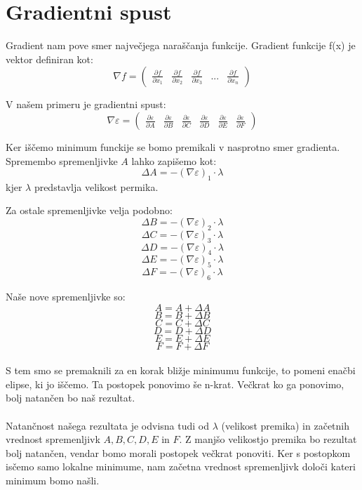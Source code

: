 \documentclass[a4paper, 12pt]{article}
\begin{document}
	\section*{Gradientni spust}
	Gradient nam pove smer največjega naraščanja funkcije. Gradient funkcije f(x) je vektor definiran kot:
	$$\nabla f = \begin{pmatrix}\frac{\partial f}{\partial x_{1}} & \frac{\partial f}{\partial x_{2}} & \frac{\partial f}{\partial x_{3}} & ... & \frac{\partial f}{\partial x_{n}}\end{pmatrix}$$
	
	V našem primeru je gradientni spust:
	$$\nabla \varepsilon = 
	\begin{pmatrix}
	\frac{\partial \varepsilon}{\partial A} &
	\frac{\partial \varepsilon}{\partial B} &
	\frac{\partial \varepsilon}{\partial C} &
	\frac{\partial \varepsilon}{\partial D} &
	\frac{\partial \varepsilon}{\partial E} &
	\frac{\partial \varepsilon}{\partial F}
	\end{pmatrix}$$
	
	Ker iščemo minimum funckije se bomo premikali v nasprotno smer gradienta. Spremembo spremenljivke $A$ lahko zapišemo kot:
	$$\Delta A = -(\nabla \varepsilon)_1 \cdot \lambda$$
	kjer $\lambda$ predstavlja velikost permika. 
	
	Za ostale spremenljivke velja podobno:
	$$\Delta B = -(\nabla \varepsilon)_2 \cdot \lambda$$
	$$\Delta C = -(\nabla \varepsilon)_3 \cdot \lambda$$
	$$\Delta D = -(\nabla \varepsilon)_4 \cdot \lambda$$
	$$\Delta E = -(\nabla \varepsilon)_5 \cdot \lambda$$
	$$\Delta F = -(\nabla \varepsilon)_6 \cdot \lambda$$
	
	Naše nove spremenljivke so:
	$$ A = A + \Delta A$$
	$$ B = B + \Delta B$$
	$$ C = C + \Delta C$$
	$$ D = D + \Delta D$$
	$$ E = E + \Delta E$$
	$$ F = F + \Delta F$$
	
	\paragraph{}
	S tem smo se premaknili za en korak bližje minimumu funkcije, to pomeni enačbi elipse, ki jo iščemo. Ta postopek ponovimo še n-krat. Večkrat ko ga ponovimo, bolj natančen bo naš rezultat. 
	\paragraph{}
	Natančnost našega rezultata je odvisna tudi od $\lambda$ (velikost premika) in začetnih vrednost spremenljivk $A, B, C, D, E$ in $F$. Z manjšo velikostjo premika bo rezultat bolj natančen, vendar bomo morali postopek večkrat ponoviti. Ker s postopkom isčemo samo lokalne minimume, nam začetna vrednost spremenljivk določi kateri minimum bomo našli.
\end{document}
